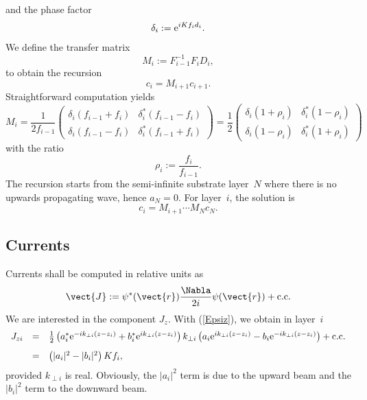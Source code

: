 and the phase factor
\begin{equation}
   \delta_i := {\rm e}^{iKf_id_i}.
\end{equation}
We define the transfer matrix
\begin{equation}\label{Edef_M}
  M_i
  := F_{i-1}^{-1}F_i D_i,
\end{equation}
to obtain the recursion 
\begin{equation}\label{EcMc}
  c_i = M_{i+1} c_{i+1}.
\end{equation}
Straightforward computation yields
\begin{equation}
  M_i
   = \frac{1}{2f_{i-1}}
   \left(\begin{array}{cc}
       \delta_i(f_{i-1}+f_{i})&\delta_i^*(f_{i-1}-f_{i})\\
       \delta_i(f_{i-1}-f_{i})&\delta_i^*(f_{i-1}+f_{i})
   \end{array}\right)
   = \frac{1}{2}
   \left(\begin{array}{cc}
       \delta_i(1+\rho_{i})&\delta_i^*(1-\rho_{i})\\
       \delta_i(1-\rho_{i})&\delta_i^*(1+\rho_{i})
   \end{array}\right)
\end{equation}
with the ratio
\begin{equation}
  \rho_i := \frac{f_{i}}{f_{i-1}}.
\end{equation}
The recursion starts from the semi-infinite substrate layer~$N$
where there is no upwards propagating wave, hence $a_N=0$.
For layer~$i$, the solution is
\begin{equation}\label{Eci}
  c_i
  =
  M_{i+1}\cdots M_{N} c_N.
\end{equation}


\subsection{Currents}

Currents shall be computed in relative units as
\begin{equation}
  \vect{J}:=\psi^*(\vect{r})\frac{\Nabla}{2i}\psi(\vect{r})+\text{c.c.}
\end{equation}
We are interested in the component $J_z$.
With (\ref{Epsiz}),
we obtain in layer~$i$
\begin{equation}\label{EJperp}
  \begin{array}{lcl}
  J_{zi} &=& \frac{1}{2}
  \left( a_i^*{\rm e}^{-ik_{\perp i}(z-z_i)} + b_i^*{\rm e}^{ik_{\perp i}(z-z_i)} \right)
  k_{\perp i}
  \left( a_i{\rm e}^{ik_{\perp i}(z-z_i)} - b_i{\rm e}^{-ik_{\perp i}(z-z_i)} \right)
  +\text{c.c.}\\[2ex]
  &=& \left( |a_i|^2 - |b_i|^2 \right) K f_i,
  \end{array}
\end{equation}
provided $k_{\perp i}$ is real.
Obviously,
the $|a_i|^2$ term is due to the upward beam
and the $|b_i|^2$ term to the downward beam.

